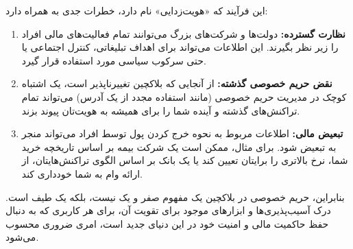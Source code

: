 این فرآیند که «هویت‌زدایی» نام دارد، خطرات جدی به همراه دارد:
\begin{enumerate}
	\item \textbf{نظارت گسترده:} دولت‌ها و شرکت‌های بزرگ می‌توانند تمام فعالیت‌های مالی افراد را زیر نظر بگیرند. این اطلاعات می‌تواند برای اهداف تبلیغاتی، کنترل اجتماعی یا حتی سرکوب سیاسی مورد استفاده قرار گیرد.
	
	\item \textbf{نقض حریم خصوصی گذشته:} از آنجایی که بلاکچین تغییرناپذیر است، یک اشتباه کوچک در مدیریت حریم خصوصی (مانند استفاده مجدد از یک آدرس) می‌تواند تمام تراکنش‌های گذشته و آینده شما را برای همیشه به هویت‌تان پیوند بزند.
	
	\item \textbf{تبعیض مالی:} اطلاعات مربوط به نحوه خرج کردن پول توسط افراد می‌تواند منجر به تبعیض شود. برای مثال، ممکن است یک شرکت بیمه بر اساس تاریخچه خرید شما، نرخ بالاتری را برایتان تعیین کند یا یک بانک بر اساس الگوی تراکنش‌هایتان، از ارائه وام به شما خودداری کند.
\end{enumerate}

بنابراین، حریم خصوصی در بلاکچین یک مفهوم صفر و یک نیست، بلکه یک طیف است. درک آسیب‌پذیری‌ها و ابزارهای موجود برای تقویت آن، برای هر کاربری که به دنبال حفظ حاکمیت مالی و امنیت خود در این دنیای جدید است، امری ضروری محسوب می‌شود.